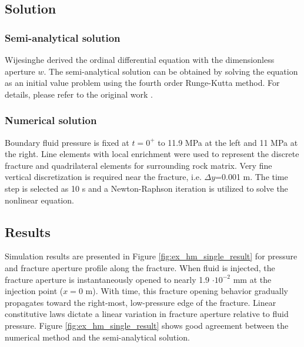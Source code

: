 \subsection{Solution}
\subsubsection{Semi-analytical solution}
Wijesinghe \cite{Wijesinghe1986} derived the ordinal differential equation with the dimensionless aperture $w$. The semi-analytical solution can be obtained by solving the equation as an initial value problem using the fourth order Runge-Kutta method. For details, please refer to the original work \cite{Wijesinghe1986}. %

\subsubsection{Numerical solution}
Boundary fluid pressure is fixed at $t=0^+$ to 11.9 MPa at the left and 11 MPa at the right. Line elements with local enrichment were used to represent the discrete fracture and quadrilateral elements for surrounding rock matrix. Very fine vertical discretization is required near the fracture, i.e. $\Delta y$=0.001 m. The time step is selected as 10 s and a Newton-Raphson iteration is utilized to solve the nonlinear equation. 


\subsection{Results}
Simulation results are presented in Figure \ref{fig:ex_hm_single_result} for pressure and fracture aperture profile along the fracture. When fluid is injected, the fracture aperture is instantaneously opened to nearly 1.9 $\cdot 10^{-2}$ mm at the injection point ($x = 0$ m). With time, this fracture opening behavior gradually propagates toward the right-most, low-pressure edge of the fracture. Linear constitutive laws dictate a linear variation in fracture aperture relative to fluid pressure.
Figure \ref{fig:ex_hm_single_result} shows good agreement between the  numerical method and the semi-analytical solution.

